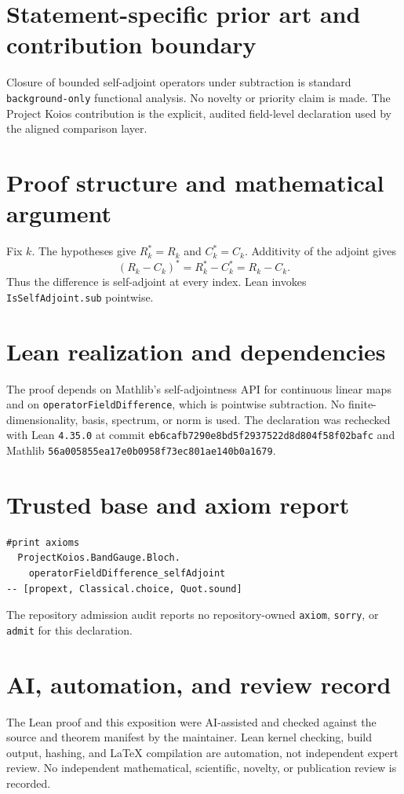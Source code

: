 \documentclass[11pt]{article}
\begin{document}
\section{Statement-specific prior art and contribution boundary}
Closure of bounded self-adjoint operators under subtraction is standard \texttt{background-only} functional analysis.  No novelty or priority claim is made.  The Project Koios contribution is the explicit, audited field-level declaration used by the aligned comparison layer.

\section{Proof structure and mathematical argument}
Fix $k$.  The hypotheses give $R_k^*=R_k$ and $C_k^*=C_k$.  Additivity of the adjoint gives
\[
 (R_k-C_k)^*=R_k^*-C_k^*=R_k-C_k.
\]
Thus the difference is self-adjoint at every index.  Lean invokes \texttt{IsSelfAdjoint.sub} pointwise.

\section{Lean realization and dependencies}
The proof depends on Mathlib's self-adjointness API for continuous linear maps and on \texttt{operatorFieldDifference}, which is pointwise subtraction.  No finite-dimensionality, basis, spectrum, or norm is used.  The declaration was rechecked with Lean \texttt{4.35.0} at commit \texttt{eb6cafb7290e8bd5f2937522d8d804f58f02bafc} and Mathlib \texttt{56a005855ea17e0b0958f73ec801ae140b0a1679}.

\section{Trusted base and axiom report}
\begin{verbatim}
#print axioms
  ProjectKoios.BandGauge.Bloch.
    operatorFieldDifference_selfAdjoint
-- [propext, Classical.choice, Quot.sound]
\end{verbatim}
The repository admission audit reports no repository-owned \texttt{axiom}, \texttt{sorry}, or
\texttt{admit} for this declaration.

\section{AI, automation, and review record}
The Lean proof and this exposition were AI-assisted and checked against the source and theorem
manifest by the maintainer.  Lean kernel checking, build output, hashing, and LaTeX compilation are
automation, not independent expert review.  No independent mathematical, scientific, novelty, or
publication review is recorded.
\end{document}

